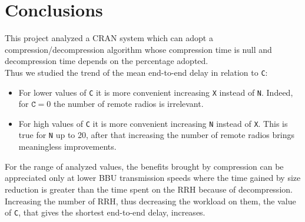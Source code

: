 \documentclass[11pt,a4paper,oneside, openright]{article}
\begin{document}
\newpage
\section{Conclusions}
This project analyzed a CRAN system which can adopt a compression/decompression algorithm whose compression time is null and decompression time depends on the percentage adopted.\\
Thus we studied the trend of the mean end-to-end delay in relation to \texttt{C}: 
\begin{itemize}
	\item For lower values of \texttt{C} it is more convenient increasing \texttt{X} instead of \texttt{N}. Indeed, for $\texttt{C} = 0 $ the number of remote radios is irrelevant.
	\item For high values of \texttt{C} it is more convenient increasing \texttt{N} instead of \texttt{X}. This is true for \texttt{N} up to 20, after that increasing the number of remote radios brings meaningless improvements.
\end{itemize}
For the range of analyzed values, the benefits brought by compression can be appreciated only at lower BBU transmission speeds where the time gained by size reduction is greater than the time spent on the RRH because of decompression. Increasing the number of RRH, thus decreasing the workload on them, the value of \texttt{C}, that gives the shortest end-to-end delay, increases.
\end{document}
